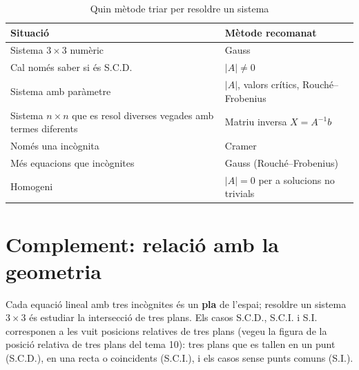 \begin{table}[!htbp]
\centering
\renewcommand{\arraystretch}{1.3}
\begin{tabularx}{\textwidth}{>{\raggedright\arraybackslash}X>{\raggedright\arraybackslash}X}
\toprule
Situació & Mètode recomanat \\
\midrule
Sistema $3\times3$ numèric & Gauss \\
Cal només saber si és S.C.D. & $|A|\neq0$ \\
Sistema amb paràmetre & $|A|$, valors crítics, Rouché--Frobenius \\
Sistema $n\times n$ que es resol diverses vegades amb termes diferents & Matriu inversa $X=A^{-1}b$ \\
Només una incògnita & Cramer \\
Més equacions que incògnites & Gauss (Rouché--Frobenius) \\
Homogeni & $|A|=0$ per a solucions no trivials \\
\bottomrule
\end{tabularx}
\caption{Quin mètode triar per resoldre un sistema}
\end{table}

\section{Complement: relació amb la geometria}

Cada equació lineal amb tres incògnites és un \textbf{pla} de l'espai; resoldre un sistema $3\times3$ és estudiar la intersecció de tres plans. Els casos S.C.D., S.C.I. i S.I. corresponen a les vuit posicions relatives de tres plans (vegeu la figura de la posició relativa de tres plans del tema 10): tres plans que es tallen en un punt (S.C.D.), en una recta o coincidents (S.C.I.), i els casos sense punts comuns (S.I.).
